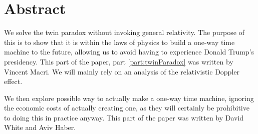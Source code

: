 \chapter*{Abstract}
	We solve the twin paradox without invoking general relativity. The purpose of this is to show that it is within the laws of physics to build a one-way time machine to the future, allowing us to avoid having to experience Donald Trump's presidency. This part of the paper, part \ref{part:twinParadox} was written by Vincent Macri. We will mainly rely on an analysis of the relativistic Doppler effect.

	We then explore possible way to actually make a one-way time machine, ignoring the economic costs of actually creating one, as they will certainly be prohibitive to doing this in practice anyway. This part of the paper was written by David White and Aviv Haber.
